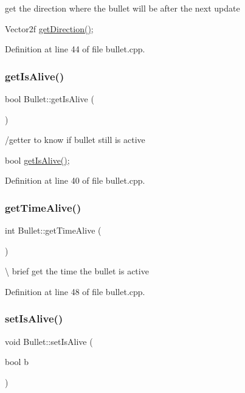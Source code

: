 get the direction where the bullet will be after the next update 

Vector2f \hyperlink{class_bullet_a6b6acf4d172bc98a9371cc431eca4e0d}{get\+Direction()}; 

Definition at line 44 of file bullet.\+cpp.

\mbox{\label{class_bullet_a86ab78893d4a171e3215486efc6dc66b}} 
\subsubsection{\texorpdfstring{get\+Is\+Alive()}{getIsAlive()}}
{\footnotesize\ttfamily bool Bullet\+::get\+Is\+Alive (\begin{DoxyParamCaption}{ }\end{DoxyParamCaption})}



/getter to know if bullet still is active 

bool \hyperlink{class_bullet_a86ab78893d4a171e3215486efc6dc66b}{get\+Is\+Alive()}; 

Definition at line 40 of file bullet.\+cpp.

\mbox{\label{class_bullet_a61627cf61a12182a8b8ac9c8a9277de5}} 
\subsubsection{\texorpdfstring{get\+Time\+Alive()}{getTimeAlive()}}
{\footnotesize\ttfamily int Bullet\+::get\+Time\+Alive (\begin{DoxyParamCaption}{ }\end{DoxyParamCaption})}

\textbackslash{} brief get the time the bullet is active 

Definition at line 48 of file bullet.\+cpp.

\mbox{\label{class_bullet_a2f178ec7de59d5ff1edd975065b4f279}} 
\subsubsection{\texorpdfstring{set\+Is\+Alive()}{setIsAlive()}}
{\footnotesize\ttfamily void Bullet\+::set\+Is\+Alive (\begin{DoxyParamCaption}\item[{bool}]{b }\end{DoxyParamCaption})}



